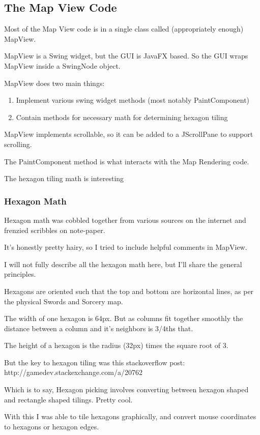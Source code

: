 \documentclass[12pt,a4paper]{article}
\begin{document}
\subsection{The Map View Code}
Most of the Map View code is in a single class called (appropriately enough)
MapView.

MapView is a Swing widget, but the GUI is JavaFX based. So the GUI wraps
MapView inside a SwingNode object.

MapView does two main things:
\begin{enumerate}
\item{Implement various swing widget methods (most notably PaintComponent)}
\item{Contain methods for necessary math for determining hexagon tiling}
\end{enumerate}

MapView implements scrollable, so it can be added to a JScrollPane to support
scrolling.

The PaintComponent method is what interacts with the Map Rendering code.

The hexagon tiling math is interesting

\subsubsection{Hexagon Math}

Hexagon math was cobbled together from various sources on the internet and
frenzied scribbles on note-paper. 

It's honestly pretty hairy, so I tried to include helpful comments in
MapView.

I will not fully describe all the hexagon math here, but I'll share the general
principles.

Hexagons are oriented such that the top and bottom are horizontal lines,
as per the physical Swords and Sorcery map.

The width of one hexagon is 64px. But as columns fit together
smoothly the distance between a column and it's neighbors is 3/4ths that.

The height of a hexagon is the radius (32px) times the square root of 3.

But the key to hexagon tiling was this stackoverflow post:
http://gamedev.stackexchange.com/a/20762

Which is to say, Hexagon picking involves converting between hexagon shaped
and rectangle shaped tilings. Pretty cool.

With this I was able to tile hexagons graphically, and convert mouse coordinates
to hexagons or hexagon edges.
\end{document}
